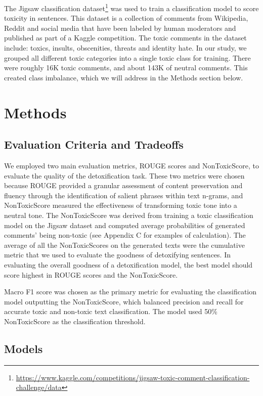 \documentclass[11pt]{article}
\begin{document}
The Jigsaw classification dataset\footnote{\url{https://www.kaggle.com/competitions/jigsaw-toxic-comment-classification-challenge/data}} was used to train a classification model to score toxicity in sentences. This dataset is a collection of comments from Wikipedia, Reddit and social media that have been labeled by human moderators and published as part of a Kaggle competition. The toxic comments in the dataset include: toxics, insults, obscenities, threats and identity hate. In our study, we grouped all different toxic categories into a single toxic class for training. There were roughly 16K toxic comments, and about 143K of neutral comments. This created class imbalance, which we will address in the Methods section below.

\section{Methods}

\subsection{Evaluation Criteria and Tradeoffs}

We employed two main evaluation metrics, ROUGE scores and NonToxicScore, to evaluate the quality of the detoxification task. These two metrics were chosen because ROUGE provided a granular assessment of content preservation and fluency through the identification of salient phrases within text n-grams, and NonToxicScore measured the effectiveness of transforming toxic tone into a neutral tone. The NonToxicScore was derived from training a toxic classification model on the Jigsaw dataset and computed average probabilities of generated comments’ being non-toxic (see Appendix C for examples of calculation). The average of all the NonToxicScores on the generated texts were the cumulative metric that we used to evaluate the goodness of detoxifying sentences. In evaluating the overall goodness of a detoxification model, the best model should score highest in ROUGE scores and the NonToxicScore.

Macro F1 score was chosen as the primary metric for evaluating the classification model outputting the NonToxicScore, which balanced precision and recall for accurate toxic and non-toxic text classification. The model used 50\% NonToxicScore as the classification threshold.

\subsection{Models}
\end{document}
